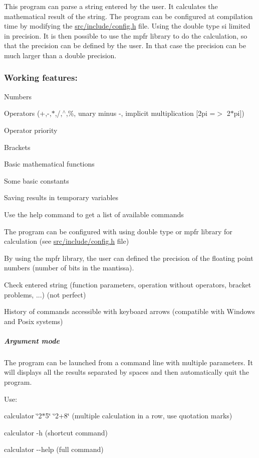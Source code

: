 This program can parse a string entered by the user. It calculates the mathematical result of the string. The program can be configured at compilation time by modifying the {\ttfamily \hyperlink{config_8h}{src/include/config.\+h}} file. Using the double type si limited in precision. It is then possible to use the mpfr library to do the calculation, so that the precision can be defined by the user. In that case the precision can be much larger than a double precision.

\subsubsection*{Working features\+:}


\begin{DoxyItemize}
\item Numbers
\item Operators (+,-\/,$\ast$,/,$^\wedge$,\%, unary minus -\/, implicit multiplication \mbox{[}2pi =$>$ 2$\ast$pi\mbox{]})
\item Operator priority
\item Brackets
\item Basic mathematical functions
\item Some basic constants
\item Saving results in temporary variables
\item Use the help command to get a list of available commands
\item The program can be configured with using double type or mpfr library for calculation (see {\ttfamily \hyperlink{config_8h}{src/include/config.\+h}} file)
\item By using the mpfr library, the user can defined the precision of the floating point numbers (number of bits in the mantissa).
\item Check entered string (function parameters, operation without operators, bracket problems, ...) (not perfect)
\item History of commands accessible with keyboard arrows (compatible with Windows and Posix systems)
\end{DoxyItemize}

\subparagraph*{Argument mode}

The program can be launched from a command line with multiple parameters. It will displays all the results separated by spaces and then automatically quit the program.
\begin{DoxyItemize}
\item Use\+:
\begin{DoxyItemize}
\item {\ttfamily calculator \char`\"{}2$\ast$5\char`\"{} \char`\"{}2+8\char`\"{}} (multiple calculation in a row, use quotation marks)
\item {\ttfamily calculator -\/h} (shortcut command)
\item {\ttfamily calculator -\/-\/help} (full command)
\end{DoxyItemize}
\end{DoxyItemize}

